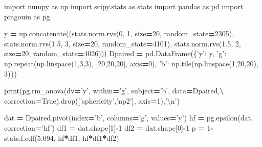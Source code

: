 \documentclass[polish,]{book}
\newenvironment{Shaded}{\begin{snugshade}}{\end{snugshade}}
\newcommand{\BuiltInTok}[1]{#1}
\newcommand{\CharTok}[1]{\textcolor[rgb]{0.31,0.60,0.02}{#1}}
\newcommand{\DecValTok}[1]{\textcolor[rgb]{0.00,0.00,0.81}{#1}}
\newcommand{\FloatTok}[1]{\textcolor[rgb]{0.00,0.00,0.81}{#1}}
\newcommand{\ImportTok}[1]{#1}
\newcommand{\NormalTok}[1]{#1}
\newcommand{\OperatorTok}[1]{\textcolor[rgb]{0.81,0.36,0.00}{\textbf{#1}}}
\newcommand{\StringTok}[1]{\textcolor[rgb]{0.31,0.60,0.02}{#1}}
\newcommand{\VariableTok}[1]{\textcolor[rgb]{0.00,0.00,0.00}{#1}}
\begin{document}
\begin{Shaded}
\begin{Highlighting}[]
\ImportTok{import}\NormalTok{ numpy }\ImportTok{as}\NormalTok{ np}
\ImportTok{import}\NormalTok{ scipy.stats }\ImportTok{as}\NormalTok{ stats}
\ImportTok{import}\NormalTok{ pandas }\ImportTok{as}\NormalTok{ pd}
\ImportTok{import}\NormalTok{ pingouin }\ImportTok{as}\NormalTok{ pg}

\NormalTok{y }\OperatorTok{=}\NormalTok{ np.concatenate((stats.norm.rvs(}\DecValTok{0}\NormalTok{, }\DecValTok{1}\NormalTok{, size}\OperatorTok{=}\DecValTok{20}\NormalTok{, random_state}\OperatorTok{=}\DecValTok{2305}\NormalTok{),}
\NormalTok{                    stats.norm.rvs(}\FloatTok{1.5}\NormalTok{, }\DecValTok{3}\NormalTok{, size}\OperatorTok{=}\DecValTok{20}\NormalTok{, random_state}\OperatorTok{=}\DecValTok{4101}\NormalTok{),}
\NormalTok{                    stats.norm.rvs(}\FloatTok{1.5}\NormalTok{, }\DecValTok{2}\NormalTok{, size}\OperatorTok{=}\DecValTok{20}\NormalTok{, random_state}\OperatorTok{=}\DecValTok{4026}\NormalTok{)))}
\NormalTok{Dpaired }\OperatorTok{=}\NormalTok{ pd.DataFrame(\{}\StringTok{'y'}\NormalTok{: y,}
                        \StringTok{'g'}\NormalTok{: np.repeat(np.linspace(}\DecValTok{1}\NormalTok{,}\DecValTok{3}\NormalTok{,}\DecValTok{3}\NormalTok{), [}\DecValTok{20}\NormalTok{,}\DecValTok{20}\NormalTok{,}\DecValTok{20}\NormalTok{], axis}\OperatorTok{=}\DecValTok{0}\NormalTok{),}
                        \StringTok{'b'}\NormalTok{: np.tile(np.linspace(}\DecValTok{1}\NormalTok{,}\DecValTok{20}\NormalTok{,}\DecValTok{20}\NormalTok{), }\DecValTok{3}\NormalTok{)\})}

\BuiltInTok{print}\NormalTok{(pg.rm_anova(dv}\OperatorTok{=}\StringTok{'y'}\NormalTok{, within}\OperatorTok{=}\StringTok{'g'}\NormalTok{, subject}\OperatorTok{=}\StringTok{'b'}\NormalTok{, data}\OperatorTok{=}\NormalTok{Dpaired,}\OperatorTok{\textbackslash{}}
\NormalTok{                  correction}\OperatorTok{=}\VariableTok{True}\NormalTok{).drop([}\StringTok{'sphericity'}\NormalTok{,}\StringTok{'np2'}\NormalTok{], axis}\OperatorTok{=}\DecValTok{1}\NormalTok{),}\StringTok{'}\CharTok{\textbackslash{}n}\StringTok{'}\NormalTok{)}

\NormalTok{dat }\OperatorTok{=}\NormalTok{ Dpaired.pivot(index}\OperatorTok{=}\StringTok{'b'}\NormalTok{, columns}\OperatorTok{=}\StringTok{'g'}\NormalTok{, values}\OperatorTok{=}\StringTok{'y'}\NormalTok{)}
\NormalTok{hf }\OperatorTok{=}\NormalTok{ pg.epsilon(dat, correction}\OperatorTok{=}\StringTok{'hf'}\NormalTok{)}
\NormalTok{df1 }\OperatorTok{=}\NormalTok{ dat.shape[}\DecValTok{1}\NormalTok{]}\OperatorTok{-}\DecValTok{1}
\NormalTok{df2 }\OperatorTok{=}\NormalTok{ dat.shape[}\DecValTok{0}\NormalTok{]}\OperatorTok{-}\DecValTok{1}
\NormalTok{p }\OperatorTok{=} \DecValTok{1}\OperatorTok{-}\NormalTok{stats.f.cdf(}\FloatTok{5.094}\NormalTok{, hf}\OperatorTok{*}\NormalTok{df1, hf}\OperatorTok{*}\NormalTok{df1}\OperatorTok{*}\NormalTok{df2)}


\end{Highlighting}
\end{Shaded}
\end{document}
